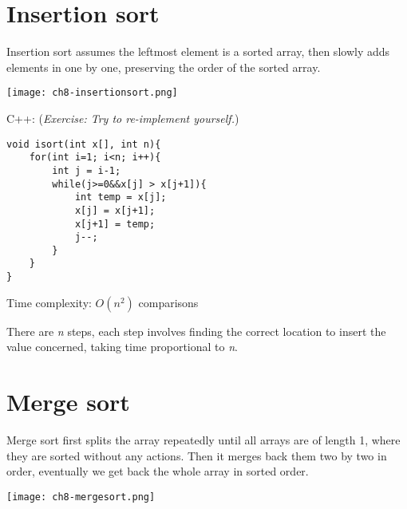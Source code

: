 \pagebreak

\section{Insertion sort}

Insertion sort assumes the leftmost element is a sorted array, then slowly adds elements in one by one, preserving the order of the sorted array.

\texttt{[image: ch8-insertionsort.png]}




C++: (\textit{Exercise: Try to re-implement yourself.})
\begin{lstlisting}
void isort(int x[], int n){
    for(int i=1; i<n; i++){
        int j = i-1;
        while(j>=0&&x[j] > x[j+1]){
            int temp = x[j];
            x[j] = x[j+1];
            x[j+1] = temp;
            j--;
        }
    }
}
\end{lstlisting}

Time complexity: $O(n^2)$ comparisons
\vspace{6mm}

There are \textit{n} steps, each step involves finding the correct location to insert the value concerned, taking time proportional to \textit{n}.

\pagebreak

\section{Merge sort}

Merge sort first splits the array repeatedly until all arrays are of length 1, where they are sorted without any actions. Then it merges back them two by two in order, eventually we get back the whole array in sorted order.

\texttt{[image: ch8-mergesort.png]}

\pagebreak


